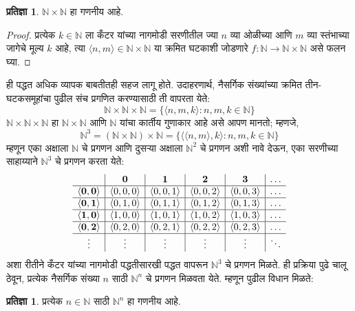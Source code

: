 \documentclass[11pt,a4paper,openany]{book}
\theoremstyle{definition}
\newtheorem{prop}[defn]{प्रतिज्ञा}
\newenvironment{explain}{}{}
\newcommand{\Setabs}[2]{\{#1:#2\}}
\newcommand{\tuple}[1]{\langle #1\rangle}
\newcommand{\Nat}{\mathbb{N}}
\begin{document}
\begin{prop}\label{sfr:siz:zigzag:natsquaredenumerable}
$\Nat \times \Nat$ हा गणनीय आहे.
\end{prop}

\begin{proof}
प्रत्येक $k \in \Nat$ ला कँटर यांच्या नागमोडी सरणीतील ज्या $n$ व्या
ओळीच्या आणि $m$ व्या स्तंभाच्या जागेचे मूल्य $k$ आहे, त्या
$\tuple{n,m} \in \Nat \times \Nat$ या क्रमित घटकाशी जोडणारे
$f \colon \Nat \to \Nat\times\Nat$ असे फलन घ्या.
\end{proof}

\begin{explain}
ही पद्धत अधिक व्यापक बाबतीतही सहज लागू होते. उदाहरणार्थ, नैसर्गिक
संख्यांच्या क्रमित तीन-घटकसमूहांचा पुढील संच प्रगणित करण्यासाठी ती
वापरता येते:
\[
\Nat \times \Nat \times \Nat = \Setabs{\tuple{n,m,k}}{n,m,k \in \Nat}
\]
$\Nat \times \Nat \times \Nat$ हा $\Nat \times \Nat$ आणि $\Nat$
यांचा कार्तीय गुणाकार आहे असे आपण मानतो; म्हणजे,
\[
\Nat^3 = (\Nat \times \Nat) \times \Nat =
\Setabs{\tuple{\tuple{n,m},k}}{n, m, k
  \in \Nat }
\]
म्हणून एका अक्षाला $\Nat$ चे प्रगणन आणि दुसऱ्या अक्षाला $\Nat^2$
चे प्रगणन अशी नावे देऊन, एका सरणीच्या साहाय्याने $\Nat^3$ चे
प्रगणन करता येते:
\[
\begin{array}{ c | c | c | c | c | c}
& \mathbf 0 & \mathbf 1 & \mathbf 2 & \mathbf 3 & \dots \\
\hline
\mathbf{\tuple{0,0}} & \tuple{0,0,0} & \tuple{0,0,1} & \tuple{0,0,2} & \tuple{0,0,3} & \dots \\
\hline
\mathbf{\tuple{0,1}} & \tuple{0,1,0} & \tuple{0,1,1} & \tuple{0,1,2} & \tuple{0,1,3} & \dots \\
\hline
\mathbf{\tuple{1,0}} & \tuple{1,0,0} & \tuple{1,0,1} & \tuple{1,0,2} & \tuple{1,0,3} & \dots \\
\hline
\mathbf{\tuple{0,2}} & \tuple{0,2,0} & \tuple{0,2,1} & \tuple{0,2,2} & \tuple{0,2,3} & \dots\\
\hline
\vdots & \vdots & \vdots & \vdots & \vdots & \ddots \\
\end{array}
\]
अशा रीतीने कँटर यांच्या नागमोडी पद्धतीसारखी पद्धत वापरून $\Nat^3$
चे प्रगणन मिळते. ही प्रक्रिया पुढे चालू ठेवून, प्रत्येक नैसर्गिक संख्या
$n$ साठी $\Nat^n$ चे प्रगणन मिळवता येते. म्हणून पुढील विधान मिळते:
\end{explain}

\begin{prop}
प्रत्येक $n \in \Nat$ साठी $\Nat^n$ हा गणनीय आहे.
\end{prop}
\end{document}
